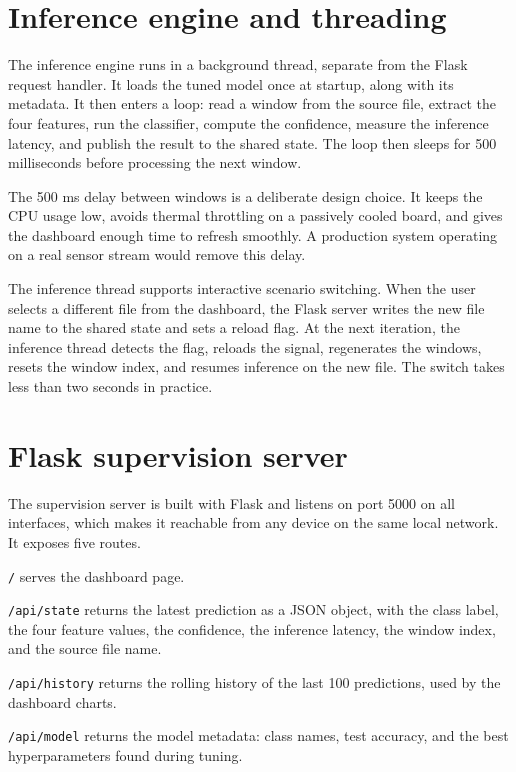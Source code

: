 \section{Inference engine and threading}

The inference engine runs in a background thread, separate from the Flask request handler. It loads the tuned model once at startup, along with its metadata. It then enters a loop: read a window from the source file, extract the four features, run the classifier, compute the confidence, measure the inference latency, and publish the result to the shared state. The loop then sleeps for 500 milliseconds before processing the next window.

The 500 ms delay between windows is a deliberate design choice. It keeps the CPU usage low, avoids thermal throttling on a passively cooled board, and gives the dashboard enough time to refresh smoothly. A production system operating on a real sensor stream would remove this delay.

The inference thread supports interactive scenario switching. When the user selects a different file from the dashboard, the Flask server writes the new file name to the shared state and sets a reload flag. At the next iteration, the inference thread detects the flag, reloads the signal, regenerates the windows, resets the window index, and resumes inference on the new file. The switch takes less than two seconds in practice.

\section{Flask supervision server}

The supervision server is built with Flask and listens on port 5000 on all interfaces, which makes it reachable from any device on the same local network. It exposes five routes.

\texttt{/} serves the dashboard page.

\texttt{/api/state} returns the latest prediction as a JSON object, with the class label, the four feature values, the confidence, the inference latency, the window index, and the source file name.

\texttt{/api/history} returns the rolling history of the last 100 predictions, used by the dashboard charts.

\texttt{/api/model} returns the model metadata: class names, test accuracy, and the best hyperparameters found during tuning.

